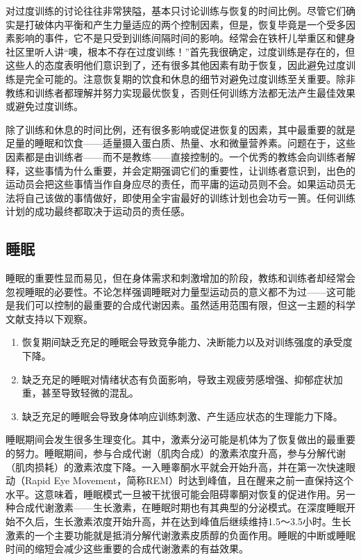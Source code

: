 对过度训练的讨论往往非常狭隘，基本只讨论训练与恢复的时间比例。尽管它们确实是打破体内平衡和产生力量适应的两个控制因素，但是，恢复毕竟是一个受多因素影响的事件，它不是只受到训练间隔时间的影响。经常会在铁杆儿举重区和健身社区里听人讲“噢，根本不存在过度训练！”首先我很确定，过度训练是存在的，但这些人的态度表明他们意识到了，还有很多其他因素有助于恢复，因此避免过度训练是完全可能的。注意恢复期的饮食和休息的细节对避免过度训练至关重要。除非教练和训练者都理解并努力实现最优恢复，否则任何训练方法都无法产生最佳效果或避免过度训练。

除了训练和休息的时间比例，还有很多影响或促进恢复的因素，其中最重要的就是足量的睡眠和饮食——适量摄入蛋白质、热量、水和微量营养素。问题在于，这些因素都是由训练者——而不是教练——直接控制的。一个优秀的教练会向训练者解释，这些事情为什么重要，并会定期强调它们的重要性，让训练者意识到，出色的运动员会把这些事情当作自身应尽的责任，而平庸的运动员则不会。如果运动员无法将自己该做的事情做好，即使用全宇宙最好的训练计划也会功亏一篑。任何训练计划的成功最终都取决于运动员的责任感。

\subsection{睡眠}

睡眠的重要性显而易见，但在身体需求和刺激增加的阶段，教练和训练者却经常会忽视睡眠的必要性。不论怎样强调睡眠对力量型运动员的意义都不为过——这可能是我们可以控制的最重要的合成代谢因素。虽然适用范围有限，但这一主题的科学文献支持以下观察。

\begin{enumerate}
    \item 恢复期间缺乏充足的睡眠会导致竞争能力、决断能力以及对训练强度的承受度下降。
    \item 缺乏充足的睡眠对情绪状态有负面影响，导致主观疲劳感增强、抑郁症状加重，甚至导致轻微的混乱。
    \item 缺乏充足的睡眠会导致身体响应训练刺激、产生适应状态的生理能力下降。
\end{enumerate}

睡眠期间会发生很多生理变化。其中，激素分泌可能是机体为了恢复做出的最重要的努力。睡眠期间，参与合成代谢（肌肉合成）的激素浓度升高，参与分解代谢（肌肉损耗）的激素浓度下降。一入睡睾酮水平就会开始升高，并在第一次快速眼动（Rapid Eye Movement，简称REM）时达到峰值，且在醒来之前一直保持这个水平。这意味着，睡眠模式一旦被干扰很可能会阻碍睾酮对恢复的促进作用。另一种合成代谢激素——生长激素，在睡眠时期也有其典型的分泌模式。在深度睡眠开始不久后，生长激素浓度开始升高，并在达到峰值后继续维持1.5～3.5小时。生长激素的一个主要功能就是抵消分解代谢激素皮质醇的负面作用。睡眠的中断或睡眠时间的缩短会减少这些重要的合成代谢激素的有益效果。

